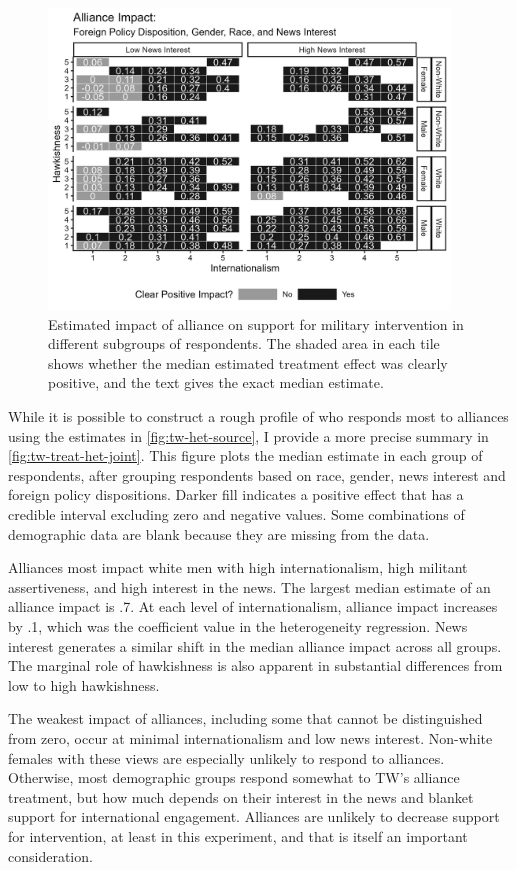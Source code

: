 \documentclass[12pt]{article}
\begin{document}
\begin{figure}[htpb]
	\centering
		\includegraphics[width=0.95\textwidth]{../figures/tw-treat-het-joint.png}
	\caption{Estimated impact of alliance on support for military intervention in different subgroups of respondents. The shaded area in each tile shows whether the median estimated treatment effect was clearly positive, and the text gives the exact median estimate.}
	\label{fig:tw-treat-het-joint}
\end{figure}


While it is possible to construct a rough profile of who responds most to alliances using the estimates in \autoref{fig:tw-het-source}, I provide a more precise summary in \autoref{fig:tw-treat-het-joint}. 
This figure plots the median estimate in each group of respondents, after grouping respondents based on race, gender, news interest and foreign policy dispositions.
Darker fill indicates a positive effect that has a credible interval excluding zero and negative values.
Some combinations of demographic data are blank because they are missing from the data. 


Alliances most impact white men with high internationalism, high militant assertiveness, and high interest in the news. 
The largest median estimate of an alliance impact is .7. 
At each level of internationalism, alliance impact increases by .1, which was the coefficient value in the heterogeneity regression.
News interest generates a similar shift in the median alliance impact across all groups. 
The marginal role of hawkishness is also apparent in substantial differences from low to high hawkishness.


The weakest impact of alliances, including some that cannot be distinguished from zero, occur at minimal internationalism and low news interest. 
Non-white females with these views are especially unlikely to respond to alliances. 
Otherwise, most demographic groups respond somewhat to TW's alliance treatment, but how much depends on their interest in the news and blanket support for international engagement.
Alliances are unlikely to decrease support for intervention, at least in this experiment, and that is itself an important consideration.
\end{document}
